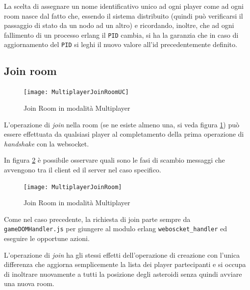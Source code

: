 \documentclass[paper=a4, fontsize=11pt]{scrartcl} %
\numberwithin{equation}{section} %
\numberwithin{figure}{section} %
\numberwithin{table}{section} %
\begin{document}
La scelta di assegnare un nome identificativo unico ad ogni player come ad ogni room nasce dal fatto che, essendo il sistema distribuito (quindi può verificarsi il passaggio di stato da un nodo ad un altro) e ricordando, inoltre, che ad ogni fallimento di un processo erlang il \texttt{PID} cambia, si ha la garanzia che in caso di aggiornamento del \texttt{PID} si leghi il nuovo valore all'id precedentemente definito. 



\subsection{Join room}

\begin{figure}
\centering
\texttt{[image: MultiplayerJoinRoomUC]}
\caption{Join Room in modalità Multiplayer}
\label{JoinRoomUC}
\end{figure}

L'operazione di \textit{join} nella room (se ne esiste almeno una, si veda figura \ref{JoinRoomUC}) può essere effettuata da qualsiasi player al completamento della prima operazione di \textit{handshake} con la websocket.

In figura \ref{JoinRoom} è possibile osservare quali sono le fasi di scambio messaggi che avvengono tra il client ed il server nel caso specifico.

\begin{figure}
\centering
\texttt{[image: MultiplayerJoinRoom]}
\caption{Join Room in modalità Multiplayer}
\label{JoinRoom}
\end{figure}

Come nel caso precedente, la richiesta di join parte sempre da \texttt{gameDOMHandler.js} per giungere al modulo erlang \texttt{weboscket\_handler} ed eseguire le opportune azioni.

L'operazione di \textit{join} ha gli stessi effetti dell'operazione di creazione con l'unica differenza che aggiorna semplicemente la lista dei player partecipanti e si occupa di inoltrare nuovamente a tutti la posizione degli asteroidi senza quindi avviare una nuova room. 
\end{document}
